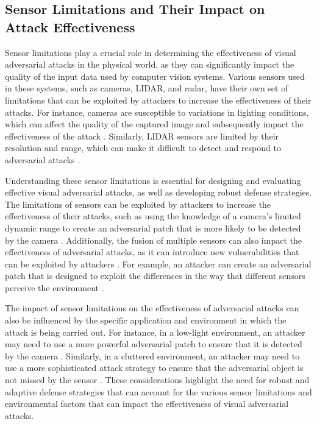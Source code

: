 \documentclass[11pt]{article}
\begin{document}
\subsection{Sensor Limitations and Their Impact on Attack Effectiveness}

Sensor limitations play a crucial role in determining the effectiveness of visual adversarial attacks in the physical world, as they can significantly impact the quality of the input data used by computer vision systems. Various sensors used in these systems, such as cameras, LIDAR, and radar, have their own set of limitations that can be exploited by attackers to increase the effectiveness of their attacks. For instance, cameras are susceptible to variations in lighting conditions, which can affect the quality of the captured image and subsequently impact the effectiveness of the attack \cite{ref142}. Similarly, LIDAR sensors are limited by their resolution and range, which can make it difficult to detect and respond to adversarial attacks \cite{ref148}.

Understanding these sensor limitations is essential for designing and evaluating effective visual adversarial attacks, as well as developing robust defense strategies. The limitations of sensors can be exploited by attackers to increase the effectiveness of their attacks, such as using the knowledge of a camera's limited dynamic range to create an adversarial patch that is more likely to be detected by the camera \cite{ref141}. Additionally, the fusion of multiple sensors can also impact the effectiveness of adversarial attacks, as it can introduce new vulnerabilities that can be exploited by attackers \cite{ref149}. For example, an attacker can create an adversarial patch that is designed to exploit the differences in the way that different sensors perceive the environment \cite{ref150}.

The impact of sensor limitations on the effectiveness of adversarial attacks can also be influenced by the specific application and environment in which the attack is being carried out. For instance, in a low-light environment, an attacker may need to use a more powerful adversarial patch to ensure that it is detected by the camera \cite{ref2}. Similarly, in a cluttered environment, an attacker may need to use a more sophisticated attack strategy to ensure that the adversarial object is not missed by the sensor \cite{ref151}. These considerations highlight the need for robust and adaptive defense strategies that can account for the various sensor limitations and environmental factors that can impact the effectiveness of visual adversarial attacks.
\end{document}
